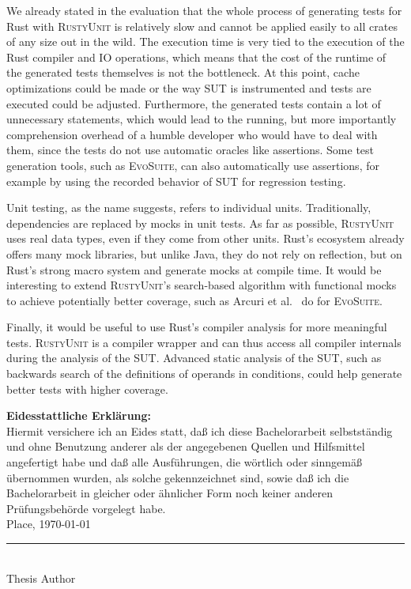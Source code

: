 \documentclass[paper=a4,%
  twoside,%
  BCOR4mm,%
  abstract=true,%
  toc=bibliography,%
  chapterprefix=true,%
  toc=bibliographynumbered,%
  open=right,%
  english,%
  pagesize=pdftex]{scrreprt}
\begin{document}
We already stated in the evaluation that the whole process of generating tests for Rust with \textsc{RustyUnit} is relatively slow and cannot be applied easily to all crates of any size out in the wild. The execution time is very tied to the execution of the Rust compiler and IO operations, which means that the cost of the runtime of the generated tests themselves is not the bottleneck. At this point, cache optimizations could be made or the way \ac{SUT} is instrumented and tests are executed could be adjusted. Furthermore, the generated tests contain a lot of unnecessary statements, which would lead to the running, but more importantly comprehension overhead of a humble developer who would have to deal with them, since the tests do not use automatic oracles like assertions. Some test generation tools, such as \textsc{EvoSuite}, can also automatically use assertions, for example by using the recorded behavior of \ac{SUT} for regression testing. 

Unit testing, as the name suggests, refers to individual units. Traditionally, dependencies are replaced by mocks in unit tests. As far as possible, \textsc{RustyUnit} uses real data types, even if they come from other units. Rust's ecosystem already offers many mock libraries, but unlike Java, they do not rely on reflection, but on Rust's strong macro system and generate mocks at compile time. It would be interesting to extend \textsc{RustyUnit}'s search-based algorithm with functional mocks to achieve potentially better coverage, such as Arcuri et al.~\cite{Arcuri2017} do for \textsc{EvoSuite}.

Finally, it would be useful to use Rust's compiler analysis for more meaningful tests. \textsc{RustyUnit} is a compiler wrapper and can thus access all compiler internals during the analysis of the \ac{SUT}. Advanced static analysis of the \ac{SUT}, such as backwards search of the definitions of operands in conditions, could help generate better tests with higher coverage. 


\backmatter%
\appendix
\cleardoublepage
\thispagestyle{empty}
\null\vfill
\noindent\textbf{Eidesstattliche Erklärung:}\\[1.5ex]
Hiermit versichere ich an Eides statt, daß ich diese Bachelorarbeit
selbstständig und ohne Benutzung anderer als der angegebenen Quellen und
Hilfsmittel angefertigt habe und daß alle Ausführungen, die wörtlich oder
sinngemäß übernommen wurden, als solche gekennzeichnet sind, sowie daß ich die
Bachelorarbeit in gleicher oder ähnlicher Form noch keiner anderen
Prüfungsbehörde vorgelegt habe.\\[1.5cm]
Place, \today\quad\rule{6cm}{0.1mm}\\
\null\hspace{5cm} {\small Thesis Author}

\clearpage


\clearpage
\printbibliography
\end{document}

